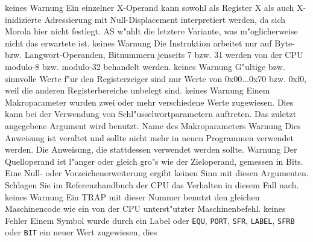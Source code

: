 \documentclass[12pt,a4paper,twoside]{report}
\newcommand{\tty}[1]{{\tt #1}}
\begin{document}
\begin{description}
               {keines}
               {Warnung}
               {Ein einzelner X-Operand kann sowohl als Register X als
                auch X-inidizierte Adressierung mit Null-Displacement
                interpretiert werden, da sich Morola hier nicht festlegt.
                AS w"ahlt die letztere Variante, was m"oglicherweise nicht
                das erwartete ist.}
               {keines}
               {Warnung}
               {Die Instruktion arbeitet nur auf Byte- bzw.
                Langwort-Operanden, Bitnummern jenseits 7 bzw. 31 werden
                von der CPU modulo-8 bzw. modulo-32 behandelt werden.}
               {keines}
               {Warnung}
               {G"ultige bzw. sinnvolle Werte f"ur den Registerzeiger sind
                nur Werte von 0x00...0x70 bzw. 0xf0, weil die anderen
                Registerbereiche unbelegt sind.}
               {keines}
               {Warnung}
               {Einem Makroparameter wurden zwei oder mehr
                verschiedene Werte zugewiesen.  Dies kann bei der
                Verwendung von Schl"usselwortparametern auftreten.
                Das zuletzt angegebene Argument wird benutzt.}
               {Name des Makroparameters}
               {Warnung}
               {Dies Anweisung ist veraltet und sollte nicht mehr
                in neuen Programmen verwendet werden.}
               {Die Anweisung, die stattdessen verwendet werden sollte.}
               {Warnung}
               {Der Quelloperand ist l"anger oder gleich gro"s wie der
                Zieloperand, gemessen in Bits.  Eine Null- oder Vorzeichenerweiterung
                ergibt keinen Sinn mit diesen Argumenten.  Schlagen Sie im 
                Referenzhandbuch der CPU das Verhalten in diesem Fall nach.}
               {keines}
               {Warnung}
               {Ein TRAP mit dieser Nummer benutzt den gleichen Maschinencode
                wie ein von der CPU unterst"utzter Maschinenbefehl.}
               {keines}
               {Fehler}
               {Einem Symbol wurde durch ein Label oder
	        \tty{EQU}, \tty{PORT}, \tty{SFR}, \tty{LABEL},
	        \tty{SFRB} oder \tty{BIT} ein neuer  Wert zugewiesen, dies
}
\end{description}
\end{document}
